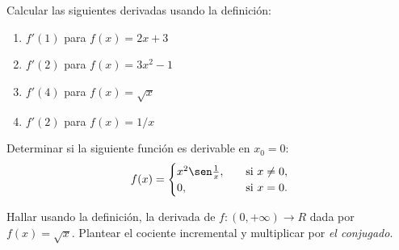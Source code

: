 \item Calcular las siguientes derivadas usando la definición:
\begin{multicols}{2}
    \begin{enumerate}
        \item $f'(1)$ para $f(x)=2x+3$
        \item $f'(2)$ para $f(x)=3x^2-1$
        \item $f'(4)$ para $f(x)=\sqrt{x}$
        \item $f'(2)$ para $f(x)=1/x$
    \end{enumerate}
\end{multicols}
\item Determinar si la siguiente función es derivable en $x_0=0$:
\[
    f(x) = \begin{cases} x^2 \sen \frac1x,\quad&\text{si $x\neq 0$},
    \\
    0, \quad&\text{si $x=0$}.
\end{cases}
\]
\item Hallar usando la definición, la derivada de $f:(0,+\infty)\to R$ dada por $f(x)=\sqrt{x}$.
Plantear el cociente incremental y multiplicar por \emph{el conjugado}.